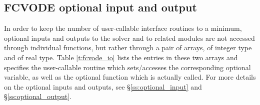 \subsection{FCVODE optional input and output}

In order to keep the number of user-callable {\fcvode} interface routines to
a minimum, optional inputs and outputs to the {\cvode} solver and to related 
modules are not accessed through individual functions, but rather through a
pair of arrays,  of integer type and  of real type.
Table \ref{t:fcvode_io} lists the entries in these two arrays and specifies the
{\fcvode} user-callable routine which sets/accesses the corresponding optional
variable, as well as the {\cvode} optional function which is actually called.
For more details on the optional inputs and outputs, see \S\ref{ss:optional_input}
and \S\ref{ss:optional_output}.

